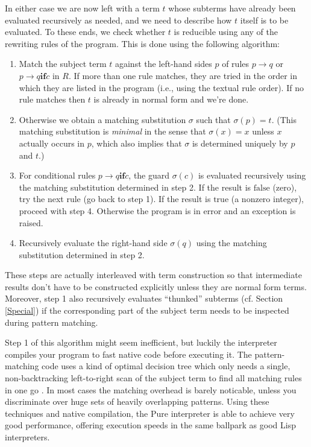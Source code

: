 \documentclass[a4paper,12pt]{article}
\begin{document}
In either case we are now left with a term $t$ whose subterms have already been evaluated recursively as needed, and we need to describe how $t$ itself is to be evaluated. To these ends, we check whether $t$ is reducible using any of the rewriting rules of the program. This is done using the following algorithm:

\begin{enumerate}
\item Match the subject term $t$ against the left-hand sides $p$ of rules $p\rightarrow q$ or $p\rightarrow q\mathrel{\mathbf{if}} c$ in $R$. If more than one rule matches, they are tried in the order in which they are listed in the program (i.e., using the textual rule order). If no rule matches then $t$ is already in normal form and we're done.
\item Otherwise we obtain a matching substitution $\sigma$ such that $\sigma(p)=t$. (This matching substitution is \emph{minimal} in the sense that $\sigma(x)=x$ unless $x$ actually occurs in $p$, which also implies that $\sigma$ is determined uniquely by $p$ and $t$.)
\item For conditional rules $p\rightarrow q\mathrel{\mathbf{if}} c$, the guard $\sigma(c)$ is evaluated recursively using the matching substitution determined in step 2. If the result is $\mathrm{false}$ (zero), try the next rule (go back to step 1). If the result is $\mathrm{true}$ (a nonzero integer), proceed with step 4. Otherwise the program is in error and an exception is raised.
\item Recursively evaluate the right-hand side $\sigma(q)$ using the matching substitution determined in step 2.
\end{enumerate}

These steps are actually interleaved with term construction so that intermediate results don't have to be constructed explicitly unless they are normal form terms. Moreover, step 1 also recursively evaluates ``thunked'' subterms (cf. Section \ref{Special}) if the corresponding part of the subject term needs to be inspected during pattern matching.

Step 1 of this algorithm might seem inefficient, but luckily the interpreter compiles your program to fast native code before executing it. The pattern-matching code uses a kind of optimal decision tree which only needs a single, non-backtracking left-to-right scan of the subject term to find all matching rules in one go \cite{Gr91}. In most cases the matching overhead is barely noticable, unless you discriminate over huge sets of heavily overlapping patterns. Using these techniques and native compilation, the Pure interpreter is able to achieve very good performance, offering execution speeds in the same ballpark as good Lisp interpreters.
\end{document}
